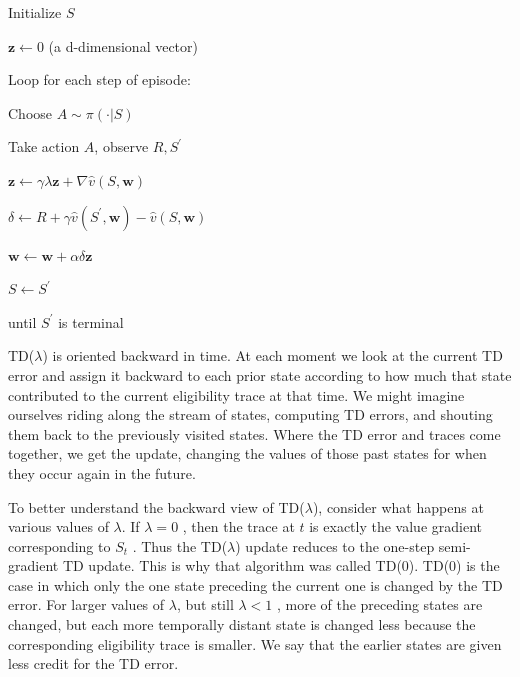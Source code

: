 \documentclass{article}
\begin{document}
\hspace{.5cm} Initialize $S$

\hspace{.5cm} $\mathbf { z } \leftarrow 0$ (a d-dimensional vector)

\hspace{.5cm} Loop for each step of episode:

\hspace{1cm} Choose $A \sim \pi ( \cdot | S )$

\hspace{1cm} Take action $A$, observe $R , S ^ { \prime }$

\hspace{1cm} $\mathbf { z } \gets \gamma \lambda \mathbf { z } + \nabla \hat { v } ( S \mathbf { , } \mathbf { w } )$

\hspace{1cm} $\delta \gets R + \gamma \hat { v } ( S ^ { \prime } \mathbf { , } \mathbf { w } ) - \hat { v } ( S \mathbf { , } \mathbf { w } )$

\hspace{1cm} $\mathbf { w } \gets \mathbf { w } + \alpha \delta \mathbf { z }$

\hspace{1cm} $S \leftarrow S ^ { \prime }$

\hspace{.5cm} until $S ^ { \prime }$ is terminal

TD($\lambda$) is oriented backward in time. At each moment we look at the current TD error and assign it backward to each prior state according to how much that state contributed to the current eligibility trace at that time. 
We might imagine ourselves riding along the stream of states, computing TD errors, and shouting them back to the previously visited states. Where the TD error and traces come together, we get the update, changing the values 
of those past states for when they occur again in the future.

To better understand the backward view of TD($\lambda$), consider what happens at various values of $\lambda$. If $\lambda   =   0$ , then the trace at $t$ is exactly the value gradient corresponding to $S _ { t }$ . 
Thus the TD($\lambda$) update reduces to the one-step semi-gradient TD update. This is why that algorithm was called TD(0). TD(0) is the case in which only the one state preceding the current one is changed by the TD error. 
For larger values of $\lambda$, but still $\lambda < 1$ , more of the preceding states are changed, but each more temporally distant state is changed less because the corresponding eligibility trace is smaller. 
We say that the earlier states are given less credit for the TD error.
\end{document}
